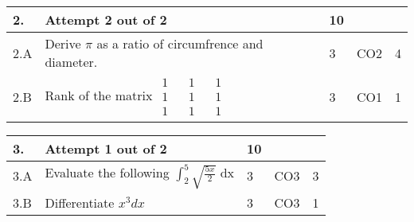 \documentclass[12pt]{article}
\begin{document}
	\begin{tabular}{|L{1cm}|L{8cm}|C{1cm}|C{1cm}|C{1cm}|}\hline
	\bf2. & \bf{Attempt} \bf{2} \bf{out of} \bf{2} & \bf{10}  & & \\ \hline





		2.A &
	Derive $\pi$ as a ratio of circumfrence and diameter. \newline
			
	 &  3 & CO2 & 4\\ \hline
		2.B &
	Rank of the matrix  $\begin{matrix} 1 && 1 &&1 \\ 1 && 1 && 1\\ 1 && 1 && 1 \end{matrix}$ \newline
			
	 &  3 & CO1 & 1\\ \hline
	\end{tabular}


\begin{tabular}{|L{1cm}|L{8cm}|C{1cm}|C{1cm}|C{1cm}|}\hline
	\bf3. & \bf{Attempt} \bf{1} \bf{out of} \bf{2} & \bf{10}  & & \\ \hline





		3.A &
	Evaluate the following $\int_{2}^{5}\sqrt{\frac{5x}{2}}$ dx \newline
			
	 &  3 & CO3 & 3\\ \hline
		3.B &
	Differentiate $x^{3}dx$ \newline
			
	 &  3 & CO3 & 1\\ \hline
	\end{tabular}
\end{document}
